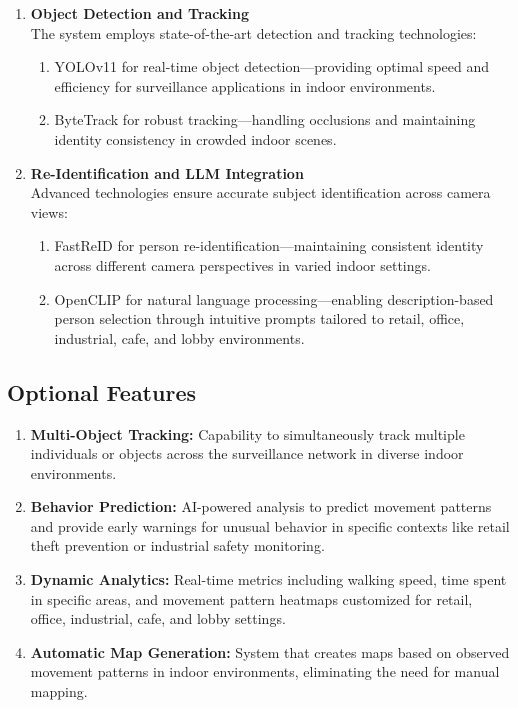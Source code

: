 \begin{enumerate}[leftmargin=80pt]
    \item \textbf{Object Detection and Tracking} \\%
        The system employs state-of-the-art detection and tracking technologies:
        \begin{enumerate}
            \item YOLOv11 for real-time object detection—providing optimal speed and efficiency for surveillance applications in indoor environments.
            \item ByteTrack for robust tracking—handling occlusions and maintaining identity consistency in crowded indoor scenes.
        \end{enumerate}
    \item \textbf{Re-Identification and LLM Integration} \\%
        Advanced technologies ensure accurate subject identification across camera views:
        \begin{enumerate}
            \item FastReID for person re-identification—maintaining consistent identity across different camera perspectives in varied indoor settings.
            \item OpenCLIP for natural language processing—enabling description-based person selection through intuitive prompts tailored to retail, office, industrial, cafe, and lobby environments.
        \end{enumerate}
\end{enumerate}

\subsection{Optional Features}
\label{subsection:optional-features}

\begin{enumerate}[leftmargin=80pt]
    \item \textbf{Multi-Object Tracking:} Capability to simultaneously track multiple individuals or objects across the surveillance network in diverse indoor environments.
    \item \textbf{Behavior Prediction:} AI-powered analysis to predict movement patterns and provide early warnings for unusual behavior in specific contexts like retail theft prevention or industrial safety monitoring.
    \item \textbf{Dynamic Analytics:} Real-time metrics including walking speed, time spent in specific areas, and movement pattern heatmaps customized for retail, office, industrial, cafe, and lobby settings.
    \item \textbf{Automatic Map Generation:} System that creates maps based on observed movement patterns in indoor environments, eliminating the need for manual mapping.
\end{enumerate}


